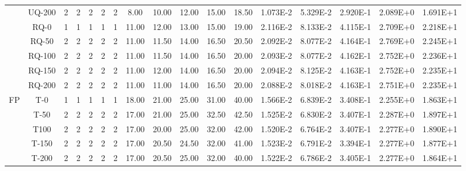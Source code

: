 \begin{table}[ht]
\begin{center}
{\begin{tabular}{cc|c|c|c|c|c|c|c|c|c|c|c|c|c|c|c|}
\multicolumn{1}{|c|}{}                      & \multicolumn{1}{|c|}{UQ-200} &	2	&	2	&	2	&	2	&	2	&	8.00	&	10.00	&	12.00	&	15.00	&	18.50	&	1.073E-2	&	5.329E-2	&	2.920E-1	&	2.089E+0	&	1.691E+1	\\
\cline{2-17}																														
\multicolumn{1}{|c|}{}                      & \multicolumn{1}{|c|}{RQ-0} &	1	&	1	&	1	&	1	&	1	&	11.00	&	12.00	&	13.00	&	15.00	&	19.00	&	2.116E-2	&	8.133E-2	&	4.115E-1	&	2.709E+0	&	2.218E+1	\\
\multicolumn{1}{|c|}{}                      & \multicolumn{1}{|c|}{RQ-50} & 	2	&	2	&	2	&	2	&	2	&	11.00	&	11.50	&	14.00	&	16.50	&	20.50	&	2.092E-2	&	8.077E-2	&	4.164E-1	&	2.769E+0	&	2.245E+1	\\
\multicolumn{1}{|c|}{}                      & \multicolumn{1}{|c|}{RQ-100} &	2	&	2	&	2	&	2	&	2	&	11.00	&	11.50	&	14.00	&	16.50	&	20.00	&	2.093E-2	&	8.077E-2	&	4.162E-1	&	2.752E+0	&	2.236E+1	\\
\multicolumn{1}{|c|}{}                      & \multicolumn{1}{|c|}{RQ-150} &	2	&	2	&	2	&	2	&	2	&	11.00	&	12.00	&	14.00	&	16.50	&	20.00	&	2.094E-2	&	8.125E-2	&	4.163E-1	&	2.752E+0	&	2.235E+1	\\
\multicolumn{1}{|c|}{}                      & \multicolumn{1}{|c|}{RQ-200} & 	2	&	2	&	2	&	2	&	2	&	11.00	&	11.00	&	14.00	&	16.50	&	20.00	&	2.088E-2	&	8.018E-2	&	4.163E-1	&	2.751E+0	&	2.235E+1	\\
\cline{1-17}																														
\multicolumn{1}{|c|}{\multirow{15}{*}{FP}} & \multicolumn{1}{|c|}{T-0} & 	1	&	1	&	1	&	1	&	1	&	18.00	&	21.00	&	25.00	&	31.00	&	40.00	&	1.566E-2	&	6.839E-2	&	3.408E-1	&	2.255E+0	&	1.863E+1	\\
\multicolumn{1}{|c|}{}                      & \multicolumn{1}{|c|}{T-50} & 	2	&	2	&	2	&	2	&	2	&	17.00	&	21.00	&	25.00	&	32.50	&	42.50	&	1.525E-2	&	6.830E-2	&	3.407E-1	&	2.287E+0	&	1.897E+1	\\
\multicolumn{1}{|c|}{}                      & \multicolumn{1}{|c|}{T100} &	2	&	2	&	2	&	2	&	2	&	17.00	&	20.00	&	25.00	&	32.00	&	42.00	&	1.520E-2	&	6.764E-2	&	3.407E-1	&	2.277E+0	&	1.890E+1	\\
\multicolumn{1}{|c|}{}                      & \multicolumn{1}{|c|}{T-150} &	2	&	2	&	2	&	2	&	2	&	17.00	&	20.50	&	24.50	&	32.00	&	41.00	&	1.523E-2	&	6.791E-2	&	3.394E-1	&	2.277E+0	&	1.877E+1	\\
\multicolumn{1}{|c|}{}                      & \multicolumn{1}{|c|}{T-200} &	2	&	2	&	2	&	2	&	2	&	17.00	&	20.50	&	25.00	&	32.00	&	40.00	&	1.522E-2	&	6.786E-2	&	3.405E-1	&	2.277E+0	&	1.864E+1	\\

\end{tabular}}
\end{center}
\end{table}
